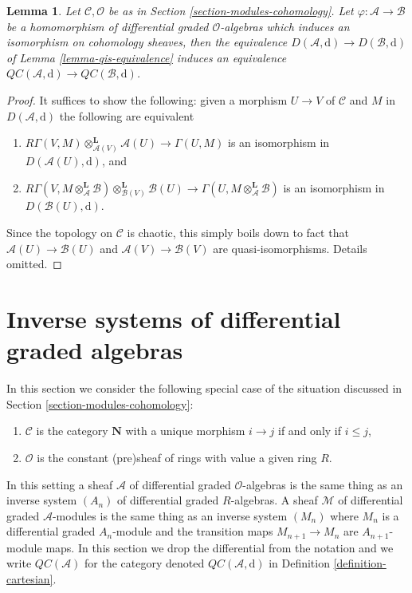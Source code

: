 \documentclass{stacks-project}
\theoremstyle{plain}
\newtheorem{lemma}[subsection]{Lemma}
\theoremstyle{definition}
\theoremstyle{remark}
\numberwithin{equation}{subsection}
\begin{document}
\begin{lemma}
\label{lemma-cartesian-qis-equivalence}
Let $\mathcal{C}, \mathcal{O}$ be as in
Section \ref{section-modules-cohomology}. Let
$\varphi : \mathcal{A} \to \mathcal{B}$ be a homomorphism of
differential graded $\mathcal{O}$-algebras which induces an
isomorphism on cohomology sheaves, then the equivalence
$D(\mathcal{A}, \text{d}) \to D(\mathcal{B}, \text{d})$
of Lemma \ref{lemma-qis-equivalence} induces an equivalence
$\mathit{QC}(\mathcal{A}, \text{d}) \to
\mathit{QC}(\mathcal{B}, \text{d})$.
\end{lemma}

\begin{proof}
It suffices to show the following: given a morphism $U \to V$ of $\mathcal{C}$
and $M$ in $D(\mathcal{A}, \text{d})$ the following are equivalent
\begin{enumerate}
\item $R\Gamma(V, M) \otimes_{\mathcal{A}(V)}^\mathbf{L} \mathcal{A}(U)
\to \Gamma(U, M)$ is an isomorphism in $D(\mathcal{A}(U), \text{d})$, and
\item $R\Gamma(V, M \otimes_\mathcal{A}^\mathbf{L} \mathcal{B})
\otimes_{\mathcal{B}(V)}^\mathbf{L} \mathcal{B}(U)
\to \Gamma(U, M \otimes_\mathcal{A}^\mathbf{L} \mathcal{B})$
is an isomorphism in $D(\mathcal{B}(U), \text{d})$.
\end{enumerate}
Since the topology on $\mathcal{C}$ is chaotic, this simply boils down
to fact that $\mathcal{A}(U) \to \mathcal{B}(U)$ and
$\mathcal{A}(V) \to \mathcal{B}(V)$ are quasi-isomorphisms.
Details omitted.
\end{proof}






\section{Inverse systems of differential graded algebras}
\label{section-qc-inverse-system}

\noindent
In this section we consider the following special case of the situation
discussed in Section \ref{section-modules-cohomology}:
\begin{enumerate}
\item $\mathcal{C}$ is the category $\mathbf{N}$
with a unique morphism $i \to j$ if and only if $i \leq j$,
\item $\mathcal{O}$ is the constant (pre)sheaf of rings with value
a given ring $R$.
\end{enumerate}
In this setting a sheaf $\mathcal{A}$ of differential graded
$\mathcal{O}$-algebras is the same thing as an inverse system
$(A_n)$ of differential graded $R$-algebras.
A sheaf $\mathcal{M}$ of differential graded $\mathcal{A}$-modules
is the same thing as an inverse system $(M_n)$ where $M_n$ is
a differential graded $A_n$-module and the transition maps
$M_{n + 1} \to M_n$ are $A_{n + 1}$-module maps.
In this section we drop the differential from the notation
and we write $\mathit{QC}(\mathcal{A})$ for the category
denoted $\mathit{QC}(\mathcal{A}, \text{d})$ in
Definition \ref{definition-cartesian}.
\end{document}
